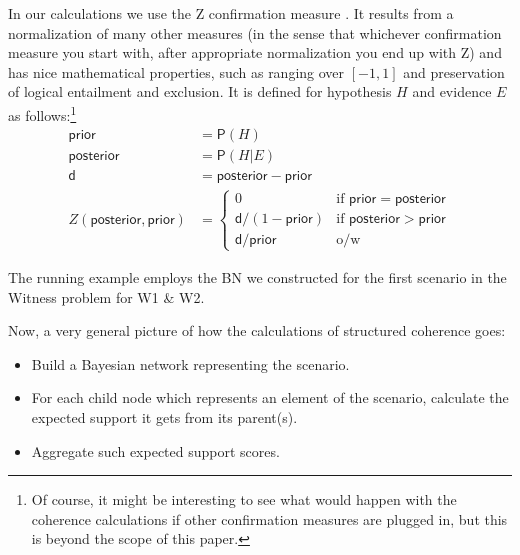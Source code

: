 \documentclass[10pt,]{scrartcl}
\newcommand{\pr}{\mathsf{P}}
\newcommand{\s}[1]{\mbox{\textsf{#1}}}
\begin{document}
In our calculations we use the \s{Z} confirmation measure \citep[see][for a detailed study and defense]{crupi2007BayesianMeasuresEvidential}. It results from a
normalization of many other measures (in the sense that whichever
confirmation measure you start with, after appropriate normalization you
end up with \s{Z}) and has nice mathematical properties, such as ranging
over \([-1,1]\) and preservation of logical entailment and exclusion. It
is defined for hypothesis \(H\) and evidence \(E\) as follows:\footnote{Of course, it might be interesting to see what would happen
with the coherence calculations if other confirmation measures are
plugged in, but this is beyond the scope of this paper.}
\begin{align*}
   \mathsf{prior} & = \pr(H) \\
   \mathsf{posterior} & = \pr(H \vert E)\\
   \mathsf{d} & = \mathsf{posterior} - \mathsf{prior} \\
       Z(\mathsf{posterior,prior}) & =  \begin{cases}
       0 & \text{if } \mathsf{prior} = \mathsf{posterior}\\
       \mathsf{d}/(1-\mathsf{prior}) & \text{if } \mathsf{posterior} > \mathsf{prior} \\
         \mathsf{d}/\mathsf{prior} & \text{o/w} 
       \end{cases}
   \end{align*}



 The running example employs the BN we
constructed for the first scenario in the \textsf{Witness} problem for \textsf{W1} \& \textsf{W2}.











Now, a very general picture of how the calculations of structured coherence  goes:

\begin{itemize}
    \item Build a Bayesian network representing the scenario.
    \item For each child node which represents an element of the scenario, calculate the expected support it gets from its parent(s). 
    \item Aggregate such expected support scores.
\end{itemize}
\end{document}
